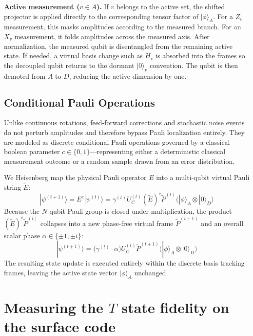 \documentclass[a4paper, onecolumn, unpublished]{quantumarticle}
\begin{document}
    \textbf{Active measurement ($v \in A$).}
    If $v$ belongs to the active set, the shifted projector is applied directly to the corresponding tensor factor of $|\phi\rangle_A$. For a $Z_v$ measurement, this masks amplitudes according to the measured branch. For an $X_v$ measurement, it folds amplitudes across the measured axis. After normalization, the measured qubit is disentangled from the remaining active state. If needed, a virtual basis change such as $H_v$ is absorbed into the frames so the decoupled qubit returns to the dormant $|0\rangle_v$ convention. The qubit is then demoted from $A$ to $D$, reducing the active dimension by one.
    \subsection{Conditional Pauli Operations}
    \label{sec:conditional_paulis}

    Unlike continuous rotations, feed-forward corrections and stochastic noise events do not perturb amplitudes and therefore bypass Pauli localization entirely. They are modeled as discrete conditional Pauli operations governed by a classical boolean parameter $c \in \{0, 1\}$—representing either a deterministic classical measurement outcome or a random sample drawn from an error distribution.

    We Heisenberg map the physical Pauli operator $E$ into a multi-qubit virtual Pauli string $\tilde{E}$:
    \begin{equation}
    	|\psi^{(t+1)}\rangle = E^c |\psi^{(t)}\rangle = \gamma^{(t)} U_C^{(t)} (\tilde{E})^c \tilde{P}^{(t)} \Big( |\phi\rangle_A \otimes |0\rangle_D \Big)
    \end{equation}
    Because the $N$-qubit Pauli group is closed under multiplication, the product $(\tilde{E})^c \tilde{P}^{(t)}$ collapses into a new phase-free virtual frame $\tilde{P}^{(t+1)}$ and an overall scalar phase $\alpha \in \{\pm 1, \pm i\}$:
    \begin{equation}
    	|\psi^{(t+1)}\rangle = \Big( \gamma^{(t)} \cdot \alpha \Big) U_C^{(t)} \tilde{P}^{(t+1)} \Big( |\phi\rangle_A \otimes |0\rangle_D \Big)
    \end{equation}
    The resulting state update is executed entirely within the discrete basis tracking frames, leaving the active state vector $|\phi\rangle_A$ unchanged.

    \section{Measuring the $T$ state fidelity on the surface code}
    \label{sec:t_state_fidelity}
\end{document}
